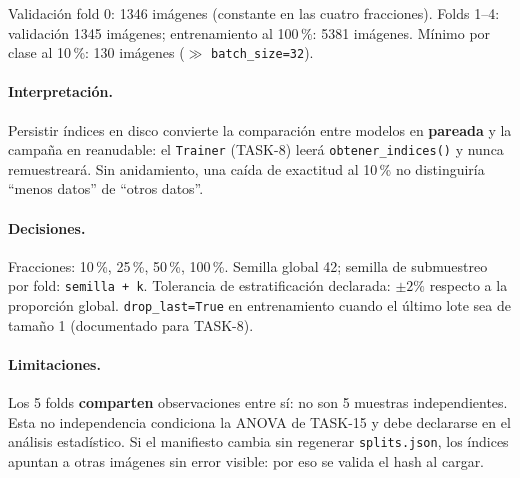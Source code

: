Validación fold 0: 1346 imágenes (constante en las cuatro fracciones).
Folds 1--4: validación 1345 imágenes; entrenamiento al 100\,\%: 5381 imágenes.
Mínimo por clase al 10\,\%: 130 imágenes ($\gg$ \texttt{batch\_size=32}).

\paragraph{Interpretación.}
Persistir índices en disco convierte la comparación entre modelos en \textbf{pareada} y la
campaña en reanudable: el \texttt{Trainer} (TASK-8) leerá \texttt{obtener\_indices()} y
nunca remuestreará. Sin anidamiento, una caída de exactitud al 10\,\% no distinguiría
``menos datos'' de ``otros datos''.

\paragraph{Decisiones.}
Fracciones: 10\,\%, 25\,\%, 50\,\%, 100\,\%.
Semilla global 42; semilla de submuestreo por fold: \texttt{semilla + k}.
Tolerancia de estratificación declarada: $\pm 2\%$ respecto a la proporción global.
\texttt{drop\_last=True} en entrenamiento cuando el último lote sea de tamaño 1
(documentado para TASK-8).

\paragraph{Limitaciones.}
Los 5 folds \textbf{comparten} observaciones entre sí: no son 5 muestras independientes.
Esta no independencia condiciona la ANOVA de TASK-15 y debe declararse en el análisis
estadístico. Si el manifiesto cambia sin regenerar \texttt{splits.json}, los índices
apuntan a otras imágenes sin error visible: por eso se valida el hash al cargar.
